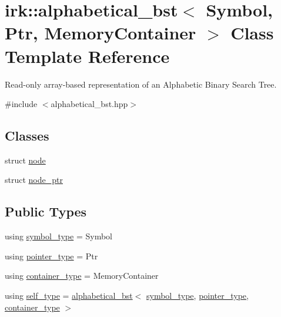 \hypertarget{classirk_1_1alphabetical__bst}{}\section{irk\+:\+:alphabetical\+\_\+bst$<$ Symbol, Ptr, Memory\+Container $>$ Class Template Reference}
\label{classirk_1_1alphabetical__bst}


Read-\/only array-\/based representation of an Alphabetic Binary Search Tree.  




{\ttfamily \#include $<$alphabetical\+\_\+bst.\+hpp$>$}

\subsection*{Classes}
\begin{DoxyCompactItemize}
\item 
struct \mbox{\hyperlink{structirk_1_1alphabetical__bst_1_1node}{node}}
\item 
struct \mbox{\hyperlink{structirk_1_1alphabetical__bst_1_1node__ptr}{node\+\_\+ptr}}
\end{DoxyCompactItemize}
\subsection*{Public Types}
\begin{DoxyCompactItemize}
\item 
using \mbox{\hyperlink{classirk_1_1alphabetical__bst_a296ccb8fa9fa9dce3b3c3beab0a5ca28}{symbol\+\_\+type}} = Symbol
\item 
using \mbox{\hyperlink{classirk_1_1alphabetical__bst_ae689c05ab96a71769e24908d5c73765c}{pointer\+\_\+type}} = Ptr
\item 
using \mbox{\hyperlink{classirk_1_1alphabetical__bst_aeed9efc6a48ff6d504a608e06223f386}{container\+\_\+type}} = Memory\+Container
\item 
using \mbox{\hyperlink{classirk_1_1alphabetical__bst_ad7af88cf8e49989f7c5521dd08580a9a}{self\+\_\+type}} = \mbox{\hyperlink{classirk_1_1alphabetical__bst}{alphabetical\+\_\+bst}}$<$ \mbox{\hyperlink{classirk_1_1alphabetical__bst_a296ccb8fa9fa9dce3b3c3beab0a5ca28}{symbol\+\_\+type}}, \mbox{\hyperlink{classirk_1_1alphabetical__bst_ae689c05ab96a71769e24908d5c73765c}{pointer\+\_\+type}}, \mbox{\hyperlink{classirk_1_1alphabetical__bst_aeed9efc6a48ff6d504a608e06223f386}{container\+\_\+type}} $>$
\end{DoxyCompactItemize}
